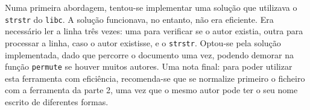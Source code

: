 Numa primeira abordagem, tentou-se implementar uma solução que utilizava
o \texttt{strstr} do \texttt{libc}. A solução funcionava, no entanto, não era
eficiente. Era necessário ler a linha três vezes: uma para verificar se o autor
existia, outra para processar a linha, caso o autor existisse,
e o \texttt{strstr}. Optou-se pela solução implementada, dado que percorre
o documento uma vez, podendo demorar na função \texttt{permute} se houver muitos
autores. Uma nota final: para poder utilizar esta ferramenta com eficiência,
recomenda-se que se normalize primeiro o ficheiro com a ferramenta da parte 2,
uma vez que o mesmo autor pode ter o seu nome escrito de diferentes formas.



